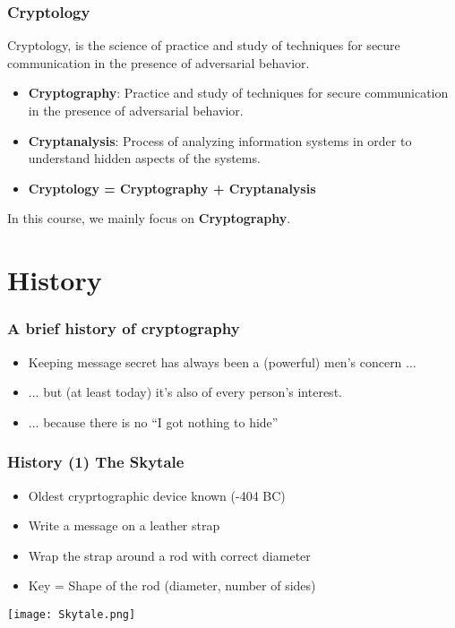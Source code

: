 \documentclass[
hyperref={pdfpagelabels=false}
,xcolor=table
]
{beamer}
\begin{document}
\begin{frame}
  \frametitle{Cryptology}

  Cryptology, is the science of practice and study of techniques for secure communication in the presence of adversarial behavior.

  \begin{itemize}
  \item \textbf{Cryptography}: Practice and study of techniques for secure communication in the presence of adversarial behavior.
  \item \textbf{Cryptanalysis}: Process of analyzing information systems in order to understand hidden aspects of the systems. 
  \item \textbf{Cryptology = Cryptography + Cryptanalysis}
  \end{itemize}

  In this course, we mainly focus on \textbf{Cryptography}. 
\end{frame}

\section{History}


\begin{frame}
  \frametitle{A brief history of cryptography}

  \begin{itemize}
  \item Keeping message secret has always been a (powerful) men's
    concern ...
  \item  ... but (at least today) it's also of every person's interest. 
  \item ... because there is no ``I got nothing to hide'' 
  \end{itemize}
\end{frame}



\begin{frame}
  \frametitle{History (1) The Skytale}
  \begin{itemize}
  \item Oldest cryprtographic device known (-404 BC)
  \item Write a message on a leather strap
  \item Wrap the strap around a rod with correct diameter
  \item Key = Shape of the rod (diameter, number of sides)
  \end{itemize}

  \begin{center}
    \texttt{[image: Skytale.png]}
  \end{center}
  
\end{frame}
\end{document}
